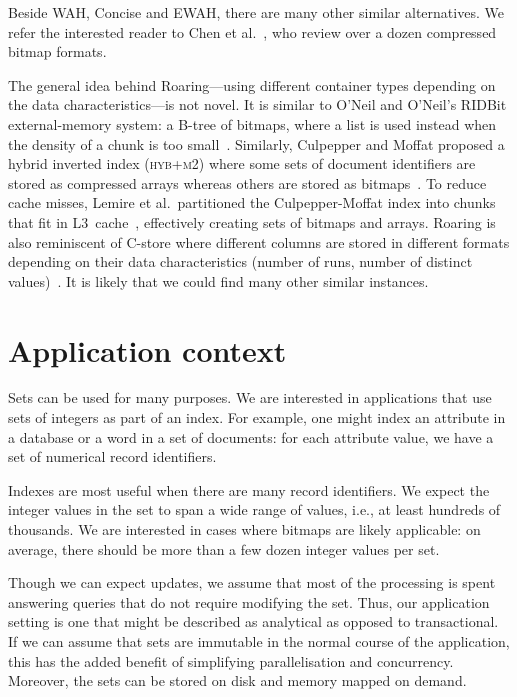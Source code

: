 \documentclass[times]{speauth}
\begin{document}
Beside WAH, Concise and EWAH, there are many other similar alternatives.  We refer the interested reader to Chen et al.~\cite{7040519}, who review over a dozen compressed bitmap formats.


The general idea behind Roaring---using different container types depending on the data characteristics---is not novel. It is similar to O'Neil and O'Neil's RIDBit external-memory system: a B-tree of  bitmaps, where  a list is used instead when the density of a chunk is too small~\cite{4318091,Rinfret:2001:BIA:375663.375669}.  Similarly,
Culpepper and Moffat proposed a hybrid inverted index (\textsc{hyb+m2}) where some sets of document identifiers are stored as compressed arrays whereas others are stored as bitmaps~\cite{culpepper:2010:esi:1877766.1877767}.
To reduce cache misses, Lemire et al.\ partitioned  the Culpepper-Moffat index into chunks that fit in L3~cache~\cite{simdcompandinter}, effectively creating sets of bitmaps and arrays.
Roaring is also reminiscent of C-store where different columns are stored in different formats depending on their data characteristics (number of runs, number of distinct values)~\cite{1083658}.
It is likely that we could find many other similar instances.




\section{Application context}\label{sec:application}

Sets can be used for many purposes. We are interested
in applications that use sets of integers as part of an index.
For example,
one might index an attribute in a database or a word in a set
of documents: for each attribute value,
we have a set of numerical record identifiers.

Indexes are most useful when there are many record identifiers.
We expect the integer values in the set to span
a wide range of values, i.e., 
at least hundreds of thousands.
We are interested in cases where bitmaps are likely applicable: on average, there should be more than a few dozen integer values per set.

 Though we can expect updates, we assume that
most of the processing is spent answering queries that do not require
modifying the set.
Thus, our application setting is one that might be described as
analytical as opposed to transactional.
If we can assume that sets are immutable in the normal course
of the application, this has the added benefit of
simplifying parallelisation and concurrency. Moreover,
the sets can be stored on disk and memory mapped on demand.
\end{document}
